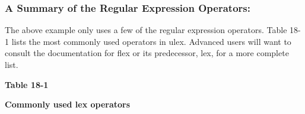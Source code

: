\subsubsection{A Summary of the Regular Expression Operators:}

The above example only uses a few of the regular expression operators.
Table 18-1 lists the most commonly used operators in \textsf{ulex}.
Advanced users will want to consult the documentation for \textsf{flex}
or its predecessor, \textsf{lex}, for a more complete list.

\vspace{0.16in}

{\centering\sffamily\bfseries
Table 18-1
\par}

{\centering\sffamily\bfseries
Commonly used lex operators
\par}

